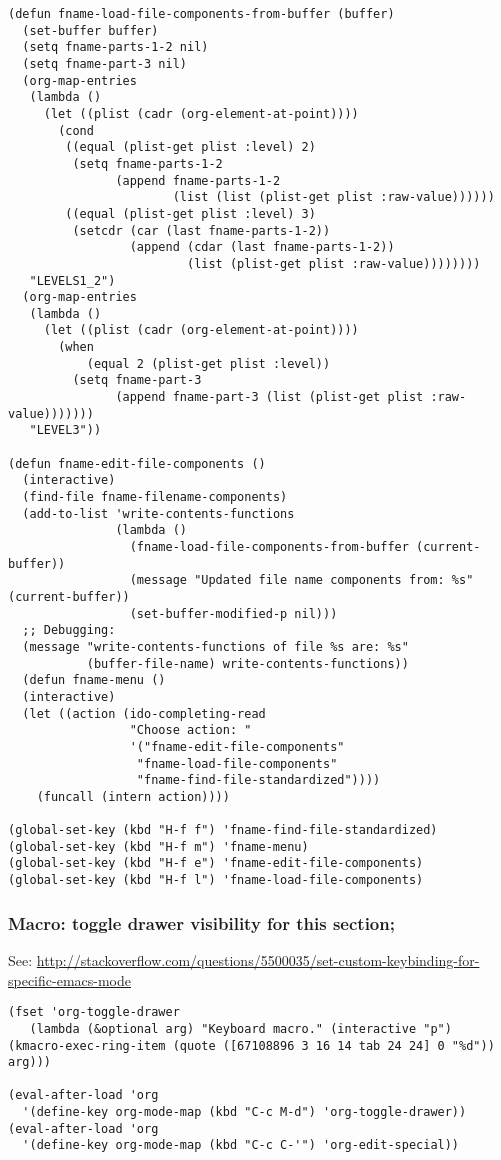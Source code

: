 \documentclass{article}
\begin{document}
\begin{verbatim}
(defun fname-load-file-components-from-buffer (buffer)
  (set-buffer buffer)
  (setq fname-parts-1-2 nil)
  (setq fname-part-3 nil)
  (org-map-entries
   (lambda ()
     (let ((plist (cadr (org-element-at-point))))
       (cond
        ((equal (plist-get plist :level) 2)
         (setq fname-parts-1-2
               (append fname-parts-1-2
                       (list (list (plist-get plist :raw-value))))))
        ((equal (plist-get plist :level) 3)
         (setcdr (car (last fname-parts-1-2))
                 (append (cdar (last fname-parts-1-2))
                         (list (plist-get plist :raw-value))))))))
   "LEVELS1_2")
  (org-map-entries
   (lambda ()
     (let ((plist (cadr (org-element-at-point))))
       (when
           (equal 2 (plist-get plist :level))
         (setq fname-part-3
               (append fname-part-3 (list (plist-get plist :raw-value)))))))
   "LEVEL3"))

(defun fname-edit-file-components ()
  (interactive)
  (find-file fname-filename-components)
  (add-to-list 'write-contents-functions
               (lambda ()
                 (fname-load-file-components-from-buffer (current-buffer))
                 (message "Updated file name components from: %s" (current-buffer))
                 (set-buffer-modified-p nil)))
  ;; Debugging:
  (message "write-contents-functions of file %s are: %s"
           (buffer-file-name) write-contents-functions))
  (defun fname-menu ()
  (interactive)
  (let ((action (ido-completing-read
                 "Choose action: "
                 '("fname-edit-file-components"
                  "fname-load-file-components"
                  "fname-find-file-standardized"))))
    (funcall (intern action))))

(global-set-key (kbd "H-f f") 'fname-find-file-standardized)
(global-set-key (kbd "H-f m") 'fname-menu)
(global-set-key (kbd "H-f e") 'fname-edit-file-components)
(global-set-key (kbd "H-f l") 'fname-load-file-components)
\end{verbatim}
\subsubsection{Macro: toggle drawer visibility for this section;}
\label{sec-2-5-19}


See: \url{http://stackoverflow.com/questions/5500035/set-custom-keybinding-for-specific-emacs-mode}

\begin{verbatim}
(fset 'org-toggle-drawer
   (lambda (&optional arg) "Keyboard macro." (interactive "p") (kmacro-exec-ring-item (quote ([67108896 3 16 14 tab 24 24] 0 "%d")) arg)))

(eval-after-load 'org
  '(define-key org-mode-map (kbd "C-c M-d") 'org-toggle-drawer))
(eval-after-load 'org
  '(define-key org-mode-map (kbd "C-c C-'") 'org-edit-special))
\end{verbatim}
\end{document}
